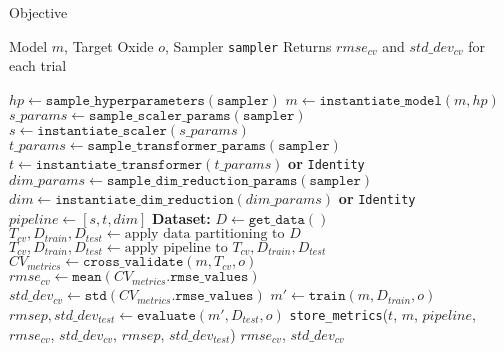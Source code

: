 \begin{algorithm}
\caption{Objective}
\label{alg:combined_objective}
\begin{algorithmic}[1]
\Require Model $m$, Target Oxide $o$, Sampler \texttt{sampler} \label{step:combined_objective_params}
\Ensure Returns $rmse_{cv}$ and $std\_dev_{cv}$ for each trial

\State $hp \gets \texttt{sample\_hyperparameters}(\texttt{sampler})$ \label{step:sample_hyperparameters}
\State $m \gets \texttt{instantiate\_model}(m, hp)$ \label{step:instantiate_model}
\Statex
\State $s\_params \gets \texttt{sample\_scaler\_params}(\texttt{sampler})$ \label{step:sample_scaler_params}
\State $s \gets \texttt{instantiate\_scaler}(s\_params)$ \label{step:instantiate_scaler}
\State $t\_params \gets \texttt{sample\_transformer\_params}(\texttt{sampler})$ \label{step:sample_transformer_params}
\State $t \gets \texttt{instantiate\_transformer}(t\_params)$ \label{step:instantiate_transformer}
\Statex \hspace{3em} \textbf{or} \texttt{Identity}
\State $dim\_params \gets \texttt{sample\_dim\_reduction\_params}(\texttt{sampler})$ \label{step:sample_dim_reduction_params}
\State $dim \gets \texttt{instantiate\_dim\_reduction}(dim\_params)$ \label{step:instantiate_dim_reduction}
\Statex \hspace{3em} \textbf{or} \texttt{Identity}
\Statex
\State $pipeline \gets [s, t, dim]$ \label{step:construct_pipeline}
\Statex
\State \textbf{Dataset: }$D \gets \texttt{get\_data}()$ \label{step:get_data}
\State $T_{cv}, D_{train}, D_{test} \gets \text{apply data partitioning to } D$ \label{step:data_partitioning}
\Statex
\State $T_{cv}, D_{train}, D_{test} \gets \text{apply pipeline to } T_{cv}, D_{train}, D_{test}$ \label{step:apply_pipeline}
\Statex
\State $CV_{metrics} \gets \texttt{cross\_validate}(m, T_{cv}, o)$ \label{step:cross_validate}
\State $rmse_{cv} \gets \texttt{mean}(CV_{metrics}.\texttt{rmse\_values})$ \label{step:mean_rmse_cv}
\State $std\_dev_{cv} \gets \texttt{std}(CV_{metrics}.\texttt{rmse\_values})$ \label{step:std_dev_cv}
\Statex
\State $m' \gets \texttt{train}(m, D_{train}, o)$ \label{step:train_model}
\State $rmsep, std\_dev_{test} \gets \texttt{evaluate}(m', D_{test}, o)$ \label{step:evaluate_model}
\Statex
\State \texttt{store\_metrics}($t$, $m$, $pipeline$, $rmse_{cv}$,
\Statex \hspace{8em} $std\_dev_{cv}$, $rmsep$, $std\_dev_{test}$) \label{step:store_metrics}
\Statex
\State \Return $rmse_{cv}$, $std\_dev_{cv}$ \label{step:return_metrics}
\end{algorithmic}
\end{algorithm}

